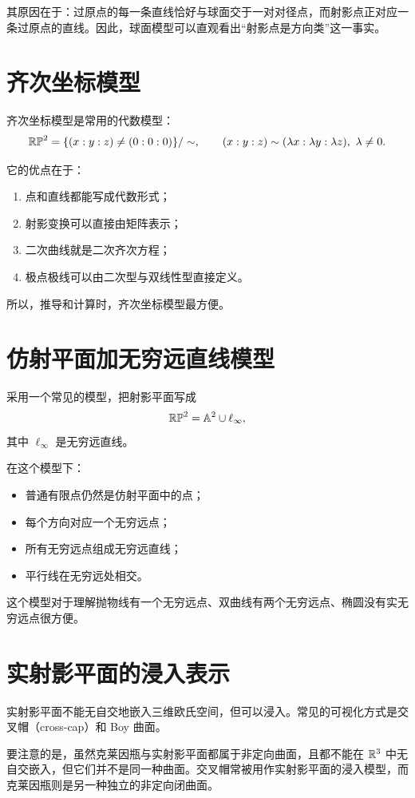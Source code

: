 其原因在于：过原点的每一条直线恰好与球面交于一对对径点，而射影点正对应一条过原点的直线。因此，球面模型可以直观看出“射影点是方向类”这一事实。

\section{齐次坐标模型}
齐次坐标模型是常用的代数模型：
\[
\mathbb{RP}^2=\{(x:y:z)\neq (0:0:0)\}/\sim,
\qquad
(x:y:z)\sim(\lambda x:\lambda y:\lambda z),\ \lambda\neq 0.
\]

它的优点在于：

\begin{enumerate}
    \item 点和直线都能写成代数形式；
    \item 射影变换可以直接由矩阵表示；
    \item 二次曲线就是二次齐次方程；
    \item 极点极线可以由二次型与双线性型直接定义。
\end{enumerate}

所以，推导和计算时，齐次坐标模型最方便。

\section{仿射平面加无穷远直线模型}
采用一个常见的模型，把射影平面写成
\[
\mathbb{RP}^2=\mathbb{A}^2\cup \ell_\infty,
\]
其中 $\ell_\infty$ 是无穷远直线。

在这个模型下：

\begin{itemize}
    \item 普通有限点仍然是仿射平面中的点；
    \item 每个方向对应一个无穷远点；
    \item 所有无穷远点组成无穷远直线；
    \item 平行线在无穷远处相交。
\end{itemize}

这个模型对于理解抛物线有一个无穷远点、双曲线有两个无穷远点、椭圆没有实无穷远点很方便。

\section{实射影平面的浸入表示}
实射影平面不能无自交地嵌入三维欧氏空间，但可以浸入。常见的可视化方式是交叉帽（cross-cap）和 Boy 曲面。

要注意的是，虽然克莱因瓶与实射影平面都属于非定向曲面，且都不能在 $\mathbb{R}^3$ 中无自交嵌入，但它们并不是同一种曲面。交叉帽常被用作实射影平面的浸入模型，而克莱因瓶则是另一种独立的非定向闭曲面。

